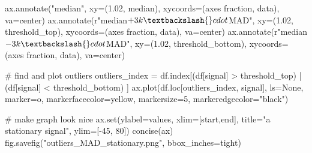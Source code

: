 \documentclass[
  letterpaper,
  DIV=11,
  numbers=noendperiod,
  oneside]{scrreprt}
\newenvironment{Shaded}{\begin{snugshade}}{\end{snugshade}}
\newcommand{\BuiltInTok}[1]{\textcolor[rgb]{0.00,0.23,0.31}{#1}}
\newcommand{\CommentTok}[1]{\textcolor[rgb]{0.37,0.37,0.37}{#1}}
\newcommand{\DecValTok}[1]{\textcolor[rgb]{0.68,0.00,0.00}{#1}}
\newcommand{\FloatTok}[1]{\textcolor[rgb]{0.68,0.00,0.00}{#1}}
\newcommand{\NormalTok}[1]{\textcolor[rgb]{0.00,0.23,0.31}{#1}}
\newcommand{\OperatorTok}[1]{\textcolor[rgb]{0.37,0.37,0.37}{#1}}
\newcommand{\StringTok}[1]{\textcolor[rgb]{0.13,0.47,0.30}{#1}}
\newcommand{\VerbatimStringTok}[1]{\textcolor[rgb]{0.13,0.47,0.30}{#1}}
\begin{document}
\begin{Shaded}
\begin{Highlighting}[]
\NormalTok{ax.annotate(}\StringTok{"median"}\NormalTok{, xy}\OperatorTok{=}\NormalTok{(}\FloatTok{1.02}\NormalTok{, median), xycoords}\OperatorTok{=}\NormalTok{(}\StringTok{\textquotesingle{}axes fraction\textquotesingle{}}\NormalTok{, }\StringTok{\textquotesingle{}data\textquotesingle{}}\NormalTok{),}
\NormalTok{            va}\OperatorTok{=}\StringTok{\textquotesingle{}center\textquotesingle{}}\NormalTok{)}
\NormalTok{ax.annotate(}\VerbatimStringTok{r"median$+3k\textbackslash{}cdot$MAD"}\NormalTok{, xy}\OperatorTok{=}\NormalTok{(}\FloatTok{1.02}\NormalTok{, threshold\_top), xycoords}\OperatorTok{=}\NormalTok{(}\StringTok{\textquotesingle{}axes fraction\textquotesingle{}}\NormalTok{, }\StringTok{\textquotesingle{}data\textquotesingle{}}\NormalTok{),}
\NormalTok{            va}\OperatorTok{=}\StringTok{\textquotesingle{}center\textquotesingle{}}\NormalTok{)}
\NormalTok{ax.annotate(}\VerbatimStringTok{r"median${-}3k\textbackslash{}cdot$MAD"}\NormalTok{, xy}\OperatorTok{=}\NormalTok{(}\FloatTok{1.02}\NormalTok{, threshold\_bottom), xycoords}\OperatorTok{=}\NormalTok{(}\StringTok{\textquotesingle{}axes fraction\textquotesingle{}}\NormalTok{, }\StringTok{\textquotesingle{}data\textquotesingle{}}\NormalTok{),}
\NormalTok{            va}\OperatorTok{=}\StringTok{\textquotesingle{}center\textquotesingle{}}\NormalTok{)}

\CommentTok{\# find and plot outliers}
\NormalTok{outliers\_index }\OperatorTok{=}\NormalTok{ df.index[(df[}\StringTok{\textquotesingle{}signal\textquotesingle{}}\NormalTok{] }\OperatorTok{\textgreater{}}\NormalTok{ threshold\_top) }\OperatorTok{|} 
\NormalTok{                          (df[}\StringTok{\textquotesingle{}signal\textquotesingle{}}\NormalTok{] }\OperatorTok{\textless{}}\NormalTok{ threshold\_bottom)}
\NormalTok{                         ]}
\NormalTok{ax.plot(df.loc[outliers\_index, }\StringTok{\textquotesingle{}signal\textquotesingle{}}\NormalTok{], ls}\OperatorTok{=}\StringTok{\textquotesingle{}None\textquotesingle{}}\NormalTok{,}
\NormalTok{        marker}\OperatorTok{=}\StringTok{\textquotesingle{}o\textquotesingle{}}\NormalTok{, markerfacecolor}\OperatorTok{=}\StringTok{\textquotesingle{}yellow\textquotesingle{}}\NormalTok{, markersize}\OperatorTok{=}\DecValTok{5}\NormalTok{,}
\NormalTok{        markeredgecolor}\OperatorTok{=}\StringTok{"black"}\NormalTok{)}

\CommentTok{\# make graph look nice}
\NormalTok{ax.}\BuiltInTok{set}\NormalTok{(ylabel}\OperatorTok{=}\StringTok{\textquotesingle{}values\textquotesingle{}}\NormalTok{,}
\NormalTok{       xlim}\OperatorTok{=}\NormalTok{[start,end],}
\NormalTok{       title}\OperatorTok{=}\StringTok{"a stationary signal"}\NormalTok{,}
\NormalTok{       ylim}\OperatorTok{=}\NormalTok{[}\OperatorTok{{-}}\DecValTok{45}\NormalTok{, }\DecValTok{80}\NormalTok{])}
\NormalTok{concise(ax)}
\NormalTok{fig.savefig(}\StringTok{"outliers\_MAD\_stationary.png"}\NormalTok{, bbox\_inches}\OperatorTok{=}\StringTok{\textquotesingle{}tight\textquotesingle{}}\NormalTok{)}
\end{Highlighting}
\end{Shaded}
\end{document}
